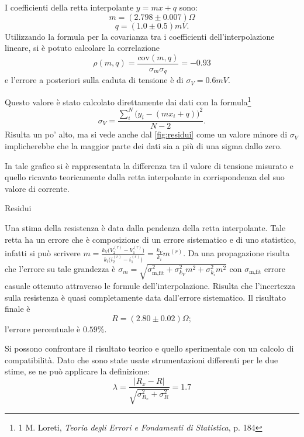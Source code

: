 I coefficienti della retta interpolante $y=mx+q$ sono:
\[m = (2.798 \pm 0.007) \Omega \] 
\[q = (1.0 \pm 0.5) mV.\]
Utilizzando la formula per la covarianza tra i coefficienti dell'interpolazione lineare, si \`e potuto calcolare
la correlazione 
\[\rho(m, q) = \frac{\textrm{cov}(m, q)}{\sigma_m \sigma_q}=-0.93\]
e l'errore a posteriori sulla caduta di tensione \`e di $\sigma_V=0.6mV$.

 Questo valore è stato calcolato direttamente dai dati con la formula\footnote{1
 M. Loreti, \textit{Teoria degli Errori e Fondamenti di Statistica}, p. 184
}
\begin{equation}
 \sigma_V = \frac{\sum_i^N \big( y_i-(m x_i+q) \big)^2}{N-2}.
\end{equation}
Risulta un po' alto, ma si vede anche dal \autoref{fig:residui} come un
valore minore di $\sigma_V$ implicherebbe che la maggior parte dei dati sia a più di una sigma dallo zero.

In tale grafico si \`e rappresentata la differenza tra il valore di tensione misurato e quello ricavato teoricamente dalla retta interpolante in corrispondenza del suo valore di corrente.

\begin{grafico}[b]
\centering

\caption{Residui}
\label{fig:residui}
\end{grafico}

Una stima della resistenza \`e data dalla pendenza della retta interpolante. Tale retta ha un errore che \`e composizione di un errore sistematico e di uno statistico, infatti si pu\`o scrivere $m=\frac{k_V \big(V_2^{(r)}-V_1^{(r)}\big)}{k_i \big(i_2^{(r)} - i_1^{(r)}\big)}=\frac{k_V}{k_i}m^{(r)}$.
Da una propagazione risulta che l'errore su tale grandezza \`e $\sigma_m=\sqrt{\sigma_{\textrm{m,fit}}^2 + \sigma_{k_V}^2 m^2 + \sigma_{k_i}^2 m^2}$ con $\sigma_{\textrm{m,fit}}$ errore casuale ottenuto attraverso le formule dell'interpolazione.
Risulta che l'incertezza sulla resistenza \`e quasi completamente data dall'errore sistematico. Il risultato finale \`e \[R=(2.80 \pm 0.02) \Omega;\] l'errore percentuale \`e $0.59 \%$.

Si possono confrontare il risultato teorico e quello sperimentale con un calcolo di compatibilit\`a. Dato che sono state usate strumentazioni differenti per le due stime, se ne pu\`o applicare la definizione: 
\[\lambda=\frac{|R_x - R|}{\sqrt{\sigma_{R_x}^2+\sigma_R^2}}=1.7\]
 











